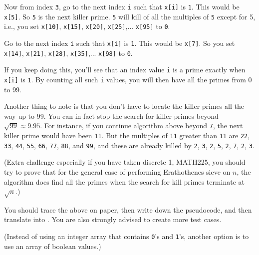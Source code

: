 Now from index \verb!3!, go to the next
index \verb!i! such that \verb!x[i]! is \verb!1!.
This would be \verb!x[5]!.
So \verb!5! is the next killer prime.
\verb!5! will kill of all the multiples of \verb!5! except for 5, i.e., 
you set
\verb!x[10]!,
\verb!x[15]!,
\verb!x[20]!,
\verb!x[25]!,...
\verb!x[95]! to \verb!0!.

Go to the next
index \verb!i! such that \verb!x[i]! is \verb!1!.
This would be \verb!x[7]!.
So you set
\verb!x[14]!,
\verb!x[21]!,
\verb!x[28]!,
\verb!x[35]!,...
\verb!x[98]! to \verb!0!.

If you keep doing this, you'll see that
an index value \verb!i! is a prime exactly when
\verb!x[i]! is \verb!1!.
By counting all such \verb!i! values, you will then
have all the primes from 0 to 99.

Another thing to note is that you don't have to
locate the killer primes all the way up to 99.
You can in fact stop the search for killer primes
beyond $\sqrt{99} \approx 9.95$.
For instance, if you continue algorithm above beyond \verb!7!,
the next killer prime would have been \verb!11!.
But the multiples of \verb!11! greater than \verb!11!
are
\verb!22!,
\verb!33!,
\verb!44!,
\verb!55!,
\verb!66!,
\verb!77!,
\verb!88!, and
\verb!99!,
and these are already killed by
\verb!2!,
\verb!3!,
\verb!2!,
\verb!5!,
\verb!2!,
\verb!7!,
\verb!2!,
\verb!3!.

(Extra challenge especially if you have taken discrete 1, MATH225,
you should try to prove
that for the general case of performing Erathothenes sieve on $n$,
the algorithm does find all the primes when the search for kill primes
terminate at $\sqrt{n}$.)

You should trace the above on paper, then write down the pseudocode,
and then translate into \cpp.
You are also strongly advised to create more test cases.

(Instead of using an integer array that contains
\verb!0!'s
and
\verb!1!'s,
another option is to use
an array of boolean values.)
